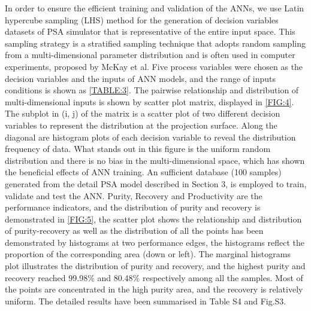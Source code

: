 \documentclass[preprint,12pt]{elsarticle}
\begin{document}
In order to ensure the efficient training and validation of the ANNs, we use Latin hypercube sampling (LHS) method for the generation of decision variables datasets of PSA simulator that is representative of the entire input space. This sampling strategy is a stratified sampling technique that adopts random sampling from a multi-dimensional parameter distribution and is often used in computer experiments, proposed by McKay et al\cite{RN51}. Five process variables were chosen as the decision variables and the inputs of ANN models, and the range of inputs conditions is shown as \cref{TABLE:3}. The pairwise relationship and distribution of multi-dimensional inputs is shown by scatter plot matrix, displayed in \cref{FIG:4}. The subplot in (i, j) of the matrix is a scatter plot of two different decision variables to represent the distribution at the projection surface. Along the diagonal are histogram plots of each decision variable to reveal the distribution frequency of data. What stands out in this figure is the uniform random distribution and there is no bias in the multi-dimensional space, which has shown the beneficial effects of ANN training. An sufficient database (100 samples) generated from the detail PSA model described in Section 3, is employed to train, validate and test the ANN. Purity, Recovery and Productivity are the performance indicators, and the distribution of purity and recovery is demonstrated in \cref{FIG:5}, the scatter plot shows the relationship and distribution of purity-recovery as well as the distribution of all the points has been demonstrated by histograms at two performance edges, the histograms reflect the proportion of the corresponding area (down or left). The marginal histograms plot illustrates the distribution of purity and recovery, and the highest purity and recovery reached 99.98\% and 80.48\% respectively among all the samples. Most of the points are concentrated in the high purity area, and the recovery is relatively uniform. The detailed results have been summarised in Table S4 and Fig.S3.
\end{document}
